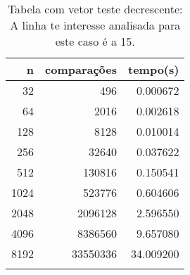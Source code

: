 \begin{table}[ht]
\centering
\begin{tabular}{rrr} \toprule
        n &    comparações &       tempo(s) \\ \midrule
      32  &            496 &      0.000672 \\
      64  &           2016 &      0.002618 \\
     128  &           8128 &      0.010014 \\
     256  &          32640 &      0.037622 \\
     512  &         130816 &      0.150541 \\
    1024  &         523776 &      0.604606 \\
    2048  &        2096128 &      2.596550 \\
    4096  &        8386560 &      9.657080 \\
    8192  &       33550336 &     34.009200 \\
\bottomrule\addlinespace
\end{tabular}
\caption{Tabela com vetor teste decrescente: A linha te interesse analisada para este caso é a 15.}
\label{tab:selectionsortDecrescente}
\end{table}
